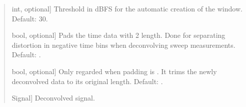 \documentclass[letterpaper,10pt,english]{sphinxmanual}
\begin{document}
\begin{fulllineitems}
\begin{quote}
\begin{description}
\begin{description}
\sphinxlineitem{\sphinxstylestrong{threshold}}{[}int, optional{]}
\sphinxAtStartPar
Threshold in dBFS for the automatic creation of the window.
Default: \sphinxhyphen{}30.

\sphinxlineitem{\sphinxstylestrong{padding}}{[}bool, optional{]}
\sphinxAtStartPar
Pads the time data with 2 length. Done for separating distortion
in negative time bins when deconvolving sweep measurements.
Default: .

\sphinxlineitem{\sphinxstylestrong{keep\_original\_length}}{[}bool, optional{]}
\sphinxAtStartPar
Only regarded when padding is . It trims the newly deconvolved
data to its original length. Default: .

\end{description}

\begin{description}
\sphinxlineitem{\sphinxstylestrong{new\_sig}}{[}Signal{]}
\sphinxAtStartPar
Deconvolved signal.

\end{description}

\end{description}\end{quote}

\end{fulllineitems}

\end{document}
